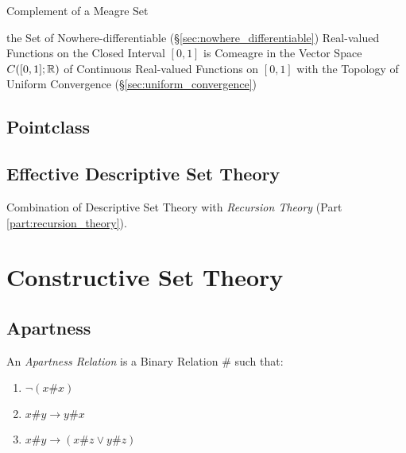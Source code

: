 Complement of a Meagre Set

the Set of Nowhere-differentiable (\S\ref{sec:nowhere_differentiable})
Real-valued Functions on the Closed Interval $[0,1]$ is Comeagre in the Vector
Space $C([0,1]; \mathbb{R})$ of Continuous Real-valued Functions on $[0,1]$ with
the Topology of Uniform Convergence (\S\ref{sec:uniform_convergence})



\subsection{Pointclass}\label{sec:pointclass}

\subsection{Effective Descriptive Set Theory}
\label{sec:effective_descriptive}

Combination of Descriptive Set Theory with \emph{Recursion Theory}
(Part \ref{part:recursion_theory}).



\section{Constructive Set Theory}\label{sec:constructive_set_theory}

\subsection{Apartness}\label{sec:apartness}

An \emph{Apartness Relation} is a Binary Relation $\#$ such that:

\begin{enumerate}
\item $\neg (x\#x)$
\item $x\#y \to y\#x$
\item $x\#y \to (x\#z \vee y\#z)$
\end{enumerate}

